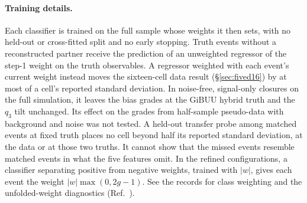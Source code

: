 \paragraph{Training details.} Each classifier is trained on the full sample whose weights it then sets, with no held-out or cross-fitted split and no early stopping. Truth events without a reconstructed partner receive the prediction of an unweighted regressor of the step-1 weight on the truth observables. A regressor weighted with each event's current weight instead moves the sixteen-cell data result (\S\ref{sec:fived16}) by at most  of a cell's reported standard deviation. In noise-free, signal-only closures on the full simulation, it leaves the bias grades at the GiBUU hybrid truth and the $q_3$ tilt unchanged. Its effect on the grades from half-sample pseudo-data with background and noise was not tested. A held-out transfer probe among matched events at fixed truth places no cell beyond half its reported standard deviation, at the data or at those two truths. It cannot show that the missed events resemble matched events in what the five features omit. In the refined configurations, a classifier separating positive from negative weights, trained with $|w|$, gives each event the weight $|w|\max(0,2g-1)$. See the records for class weighting and the unfolded-weight diagnostics (Ref.~\cite{NoteRecords2026}).

